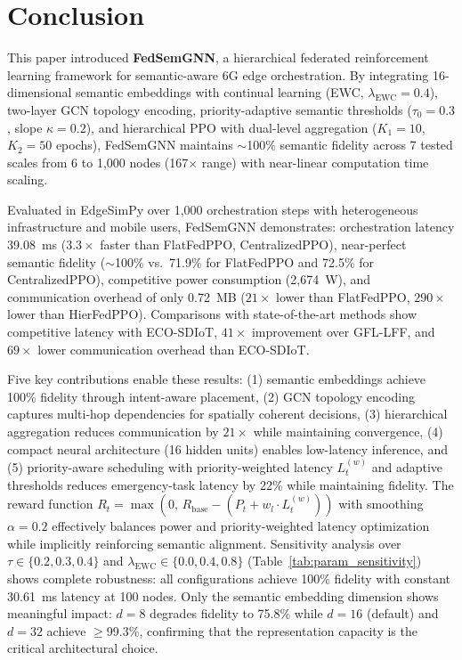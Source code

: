 \documentclass[conference]{IEEEtran}
\begin{document}
	
	\section{Conclusion}
	\label{sec:conclusion}
	
	This paper introduced \textbf{FedSemGNN}, a hierarchical federated reinforcement learning framework for semantic-aware 6G edge orchestration. By integrating 16-dimensional semantic embeddings with continual learning (EWC, $\lambda_{\mathrm{EWC}}=0.4$), two-layer GCN topology encoding, priority-adaptive semantic thresholds ($\tau_0=0.3$, slope $\kappa=0.2$), and hierarchical PPO with dual-level aggregation ($K_1 = 10$, $K_2 = 50$ epochs), FedSemGNN maintains $\sim$100\% semantic fidelity across 7 tested scales from 6 to 1{,}000 nodes (167$\times$ range) with near-linear computation time scaling.
	
	Evaluated in EdgeSimPy over 1,000 orchestration steps with heterogeneous infrastructure and mobile users, FedSemGNN demonstrates: orchestration latency 39.08~ms ($3.3\times$ faster than FlatFedPPO, CentralizedPPO), near-perfect semantic fidelity ($\sim$100\% vs.\ 71.9\% for FlatFedPPO and 72.5\% for CentralizedPPO), competitive power consumption (2{,}674~W), and communication overhead of only 0.72~MB ($21\times$ lower than FlatFedPPO, $290\times$ lower than HierFedPPO). Comparisons with state-of-the-art methods show competitive latency with ECO-SDIoT, $41\times$ improvement over GFL-LFF, and $69\times$ lower communication overhead than ECO-SDIoT.
	
	Five key contributions enable these results: (1) semantic embeddings achieve 100\% fidelity through intent-aware placement, (2) GCN topology encoding captures multi-hop dependencies for spatially coherent decisions, (3) hierarchical aggregation reduces communication by $21\times$ while maintaining convergence, (4) compact neural architecture (16 hidden units) enables low-latency inference, and (5) priority-aware scheduling with priority-weighted latency $L_t^{(w)}$ and adaptive thresholds reduces emergency-task latency by 22\% while maintaining fidelity. The reward function $R_t = \max(0,\, R_{\text{base}} - (P_t + w_l \cdot L_t^{(w)}))$ with smoothing $\alpha = 0.2$ effectively balances power and priority-weighted latency optimization while implicitly reinforcing semantic alignment. Sensitivity analysis over $\tau \in \{0.2, 0.3, 0.4\}$ and $\lambda_{\mathrm{EWC}} \in \{0.0, 0.4, 0.8\}$ (Table~\ref{tab:param_sensitivity}) shows complete robustness: all configurations achieve 100\% fidelity with constant 30.61~ms latency at 100 nodes. Only the semantic embedding dimension shows meaningful impact: $d{=}8$ degrades fidelity to 75.8\% while $d{=}16$ (default) and $d{=}32$ achieve ${\geq}$99.3\%, confirming that the representation capacity is the critical architectural choice.
	
\end{document}
